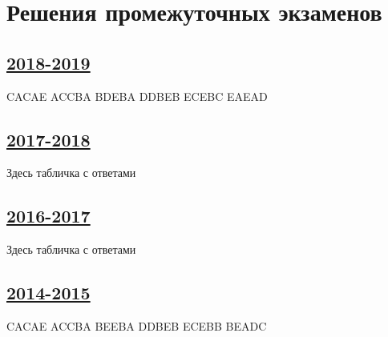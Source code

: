 \thispagestyle{empty}
\section{Решения промежуточных экзаменов}

\subsection[2018-2019]{\hyperref[sec:midterm_exam_2018_2019]{2018-2019}}
\label{sec:sol_midterm_exam_2018_2019}

CACAE ACCBA BDEBA DDBEB ECEBC EAEAD

\subsection[2017-2018]{\hyperref[sec:midterm_exam_2017_2018]{2017-2018}}
\label{sec:sol_midterm_exam_2017_2018}

Здесь табличка с ответами


\subsection[2016-2017]{\hyperref[sec:midterm_exam_2016_2017]{2016-2017}}
\label{sec:sol_midterm_exam_2016_2017}

Здесь табличка с ответами

\subsection[2014-2015]{\hyperref[sec:midterm_exam_2014_2015]{2014-2015}}
\label{sec:sol_midterm_exam_2014_2015}

CACAE ACCBA BEEBA DDBEB ECEBB BEADC